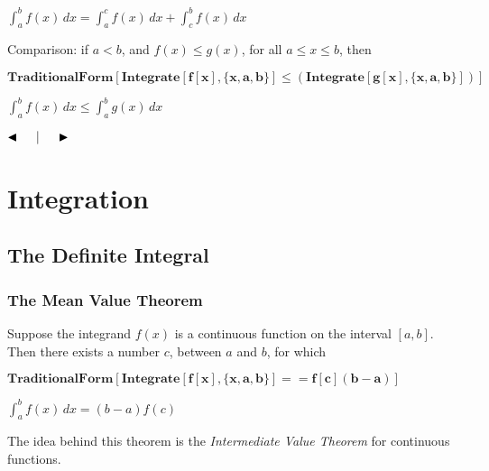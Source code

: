 \documentclass{article}
\begin{document}
\begin{doublespace}
\noindent\(\int_a^b f(x) \, dx=\int_a^c f(x) \, dx+\int_c^b f(x) \, dx\)
\end{doublespace}

Comparison: if \(a<b\), and \(f(x) \leq g(x)\), for all \(a \leq x\leq b\), then 

\begin{doublespace}
\noindent\(\pmb{\text{TraditionalForm}[\text{Integrate}[f[x],\{x,a,b\}]\leq  (\text{Integrate}[g[x],\{x,a,b\}])]}\)
\end{doublespace}

\begin{doublespace}
\noindent\(\int_a^b f(x) \, dx\leq \int_a^b g(x) \, dx\)
\end{doublespace}

$\blacktriangleleft \thickspace \thickspace \thickspace $$\thickspace \thickspace |\thickspace \thickspace $$\thickspace \thickspace \thickspace
\blacktriangleright $



\section*{Integration}

\subsection*{The Definite Integral}

\subsubsection*{The Mean Value Theorem}

Suppose the integrand \(f(x)\) is a continuous function on the interval \([a,b]\). Then there exists a number \(c\), between \(a\) and \(b\), for
which 

\begin{doublespace}
\noindent\(\pmb{\text{TraditionalForm}[\text{Integrate}[f[x],\{x,a,b\}]== f[c](b-a)]}\)
\end{doublespace}

\begin{doublespace}
\noindent\(\int_a^b f(x) \, dx=(b-a) f(c)\)
\end{doublespace}

The idea behind this theorem is the \textit{ Intermediate Value Theorem} for continuous functions. 
\end{document}
